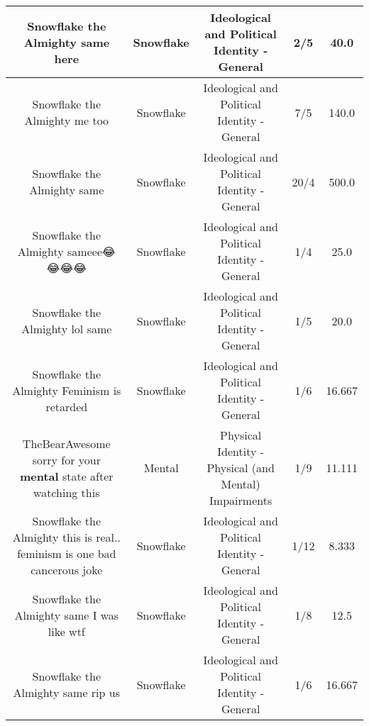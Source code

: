 \documentclass[11pt]{article}
\newlength\mylength
\begin{document}
\begin{center}
\begin{longtable}{|C{.65\mylength}|C{.30\mylength}|C{.12\mylength}|C{.12\mylength}|C{.12\mylength}|}
  \small Snowflake the Almighty same here\normalsize   & Snowflake &  Ideological and Political Identity - General & 2/5 & 40.0 \\  \hline
  \small Snowflake the Almighty me too\normalsize   & Snowflake &  Ideological and Political Identity - General & 7/5 & 140.0 \\  \hline
  \small Snowflake the Almighty same\normalsize   & Snowflake &  Ideological and Political Identity - General & 20/4 & 500.0 \\  \hline
  \small Snowflake the Almighty sameee😂😂😂😂\normalsize   & Snowflake &  Ideological and Political Identity - General & 1/4 & 25.0 \\  \hline
  \small Snowflake the Almighty lol same\normalsize   & Snowflake &  Ideological and Political Identity - General & 1/5 & 20.0 \\  \hline
  \small Snowflake the Almighty Feminism is retarded\normalsize   & Snowflake &  Ideological and Political Identity - General & 1/6 & 16.667 \\  \hline
  \small TheBearAwesome sorry for your \textbf{mental} state after watching this\normalsize   & Mental & Physical Identity - Physical (and Mental) Impairments & 1/9 & 11.111 \\  \hline
  \small Snowflake the Almighty this is real.. feminism is one bad cancerous joke\normalsize   & Snowflake &  Ideological and Political Identity - General & 1/12 & 8.333 \\  \hline
  \small Snowflake the Almighty same I was like wtf\normalsize   & Snowflake &  Ideological and Political Identity - General & 1/8 & 12.5 \\  \hline
  \small Snowflake the Almighty same rip us\normalsize   & Snowflake &  Ideological and Political Identity - General & 1/6 & 16.667 \\  \hline

\end{longtable}
\end{center}
\end{document}
